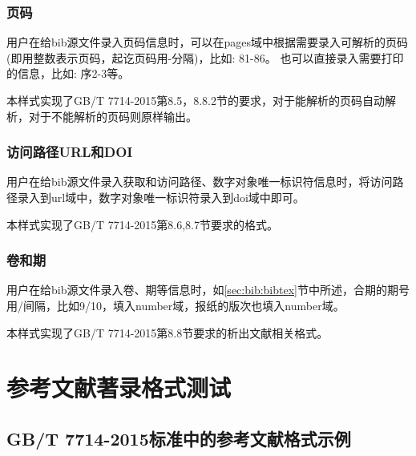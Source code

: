 \subsubsection{页码}\label{sec:fmt:pages}
\begin{property}{}{}
用户在给bib源文件录入页码信息时，可以在pages域中根据需要录入可解析的页码(即用整数表示页码，起讫页码用-分隔)，比如: 81-86。 也可以直接录入需要打印的信息，比如: 序2-3等。

本样式实现了GB/T 7714-2015第8.5，8.8.2节的要求，对于能解析的页码自动解析，对于不能解析的页码则原样输出。
\end{property}

\subsubsection{访问路径URL和DOI}
\begin{property}{}{}
用户在给bib源文件录入获取和访问路径、数字对象唯一标识符信息时，将访问路径录入到url域中，数字对象唯一标识符录入到doi域中即可。

本样式实现了GB/T 7714-2015第8.6,8.7节要求的格式。
\end{property}

\subsubsection{卷和期}\label{sec:fmt:volnum}
\begin{property}{}{}%
用户在给bib源文件录入卷、期等信息时，如\ref{sec:bib:bibtex}节中所述，合期的期号用/间隔，比如9/10，填入number域，报纸的版次也填入number域。

本样式实现了GB/T 7714-2015第8.8节要求的析出文献相关格式。
\end{property}




\section{参考文献著录格式测试}

\subsection{GB/T 7714-2015标准中的参考文献格式示例}\label{sec:eg:gb77142015}

